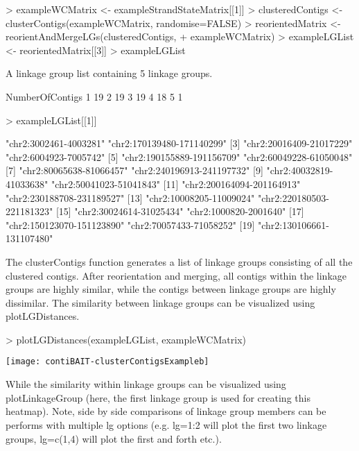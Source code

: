 \documentclass{article}
\begin{document}
\begin{Schunk}
\begin{Sinput}
> exampleWCMatrix <- exampleStrandStateMatrix[[1]]
> clusteredContigs <- clusterContigs(exampleWCMatrix, randomise=FALSE)
> reorientedMatrix <- reorientAndMergeLGs(clusteredContigs,
+  exampleWCMatrix)
> exampleLGList <- reorientedMatrix[[3]]
> exampleLGList
\end{Sinput}
\begin{Soutput}
A linkage group list containing 5 linkage groups.

  NumberOfContigs
1              19
2              19
3              19
4              18
5               1
\end{Soutput}
\begin{Sinput}
> exampleLGList[[1]]
\end{Sinput}
\begin{Soutput}
 [1] "chr2:3002461-4003281"     "chr2:170139480-171140299"
 [3] "chr2:20016409-21017229"   "chr2:6004923-7005742"    
 [5] "chr2:190155889-191156709" "chr2:60049228-61050048"  
 [7] "chr2:80065638-81066457"   "chr2:240196913-241197732"
 [9] "chr2:40032819-41033638"   "chr2:50041023-51041843"  
[11] "chr2:200164094-201164913" "chr2:230188708-231189527"
[13] "chr2:10008205-11009024"   "chr2:220180503-221181323"
[15] "chr2:30024614-31025434"   "chr2:1000820-2001640"    
[17] "chr2:150123070-151123890" "chr2:70057433-71058252"  
[19] "chr2:130106661-131107480"
\end{Soutput}
\end{Schunk}


The clusterContigs function generates a list of linkage groups consisting of all the clustered contigs.  After reorientation and merging, all contigs within the linkage groups are highly similar, while the contigs between linkage groups are highly dissimilar.  The similarity between linkage groups can be visualized using plotLGDistances.

\begin{Schunk}
\begin{Sinput}
> plotLGDistances(exampleLGList, exampleWCMatrix)
\end{Sinput}
\end{Schunk}
\texttt{[image: contiBAIT-clusterContigsExampleb]}


While the similarity within linkage groups can be visualized using plotLinkageGroup (here, the first linkage group is used for creating this heatmap). Note, side by side comparisons of linkage group members can be performs with multiple lg options (e.g. lg=1:2 will plot the first two linkage groups, lg=c(1,4) will plot the first and forth etc.).
\end{document}
